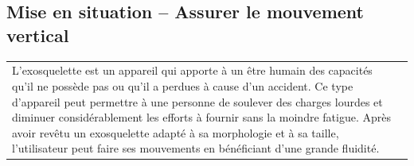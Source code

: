 \documentclass[10pt,fleqn]{article} %
\begin{document}

\vspace{4.5cm}
\pagestyle{fancy}
\thispagestyle{plain}


\def\columnseprulecolor{\color{ocre}}
\setlength{\columnseprule}{0.4pt} 

\ifprof
\else
\begin{multicols}{2}
\fi

\section*{Mise en situation -- Assurer le mouvement vertical}
\ifprof
\else

\ifprof
\else
\noindent
\begin{tabular}{m{.6\linewidth}m{.3\linewidth}}
L’exosquelette est un appareil qui apporte à un être humain des capacités qu’il ne possède pas ou qu’il a perdues à cause d’un accident. Ce type d’appareil peut permettre à une personne de soulever des charges lourdes et diminuer considérablement les efforts à fournir sans la moindre fatigue. Après avoir revêtu un exosquelette adapté à sa morphologie et à sa taille, l’utilisateur peut faire ses mouvements en bénéficiant
d’une grande fluidité.
& 

\end{tabular}
\end{multicols}
\end{document}
